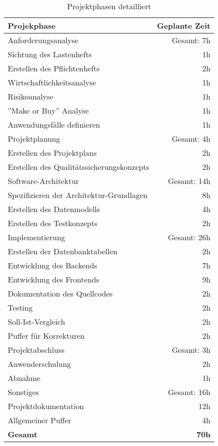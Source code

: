 \label{app:projektphasen_detail}
\begin{table}[H]
	\centering
	\begin{tabular}{lr}

		\rowcolor{white!15}				
		\textbf{Projekphase} & \textbf{Geplante Zeit} \\\hline

		\rowcolor{MidnightBlue!25}
	    Anforderungsanalyse & Gesamt: 7h \\\hline
	    Sichtung des Lastenhefts & 1h \\	    
	    Erstellen des Pflichtenhefts & 2h \\	    
	    Wirtschaftlichkeitsanalyse & 1h \\	     
	    Risikoanalyse & 1h \\	      
	    ''Make or Buy'' Analyse & 1h \\	    
		Anwendungsfälle definieren & 1h \\

	    \rowcolor{MidnightBlue!25}
	    Projektplanung & Gesamt: 4h \\\hline
	    Erstellen des Projektplans & 2h \\
		Erstellen des Qualitätssicherungskonzepts & 2h \\
		
		\rowcolor{MidnightBlue!25}
	    Software-Architektur & Gesamt: 14h \\\hline
	    Spezifizieren der Architektur-Grundlagen & 8h \\
		Erstellen des Datenmodells & 4h \\
		Erstellen des Testkonzepts & 2h \\
		
		\rowcolor{MidnightBlue!25}
	    Implementierung & Gesamt: 26h \\\hline
	    Erstellen der Datenbanktabellen & 2h \\
		Entwicklung des Backends & 7h \\
		Entwicklung des Frontends & 9h \\
		Dokumentation des Quellcodes & 2h \\
	    Testing & 2h \\
		Soll-Ist-Vergleich & 2h \\
		Puffer für Korrekturen & 2h \\
		
		\rowcolor{MidnightBlue!25}
	    Projektabschluss & Gesamt: 3h \\\hline
	    Anwenderschulung & 2h \\
		Abnahme & 1h \\
		
		\rowcolor{MidnightBlue!25}
	    Sonstiges & Gesamt: 16h \\\hline
	    Projektdokumentation & 12h \\
		Allgemeiner Puffer & 4h \\\hline
		
		\textbf{Gesamt} & \textbf{70h}				
			    
	\end{tabular}
	\caption{Projektphasen detailliert}
	\label{tab:projektphasen_detail}
	\end{table}